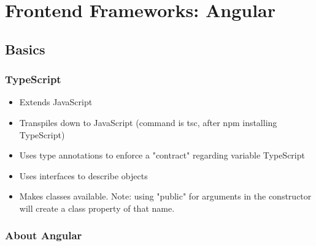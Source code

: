 \twocolumn
\chapter{Frontend Frameworks: Angular}
\section{Basics}
\subsection{TypeScript}
\begin{itemize}
  \item Extends JavaScript
  \item Transpiles down to JavaScript (command is tsc, after npm installing TypeScript)
  \item Uses type annotations to enforce a "contract" regarding variable TypeScript
  \item Uses interfaces to describe objects
  \item Makes classes available. Note: using "public" for arguments in the constructor will create a class property of that name.
\end{itemize}

\subsection{About Angular}

